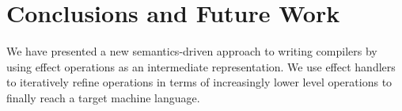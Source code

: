 \documentclass[a4paper,UKenglish,cleveref, autoref, thm-restate, anonymous]{oasics-v2021}
\begin{document}
% 

\section{Conclusions and Future Work}\label{sec:conclusion}

We have presented a new semantics-driven approach to writing compilers by using effect operations as an intermediate representation.
We use effect handlers to iteratively refine operations in terms of increasingly lower level operations to finally reach a target machine language.
\end{document}
